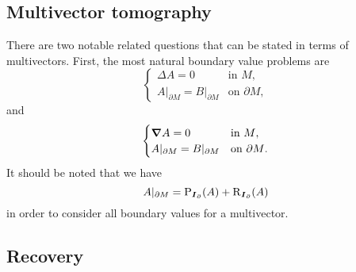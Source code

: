 \subsection{Multivector tomography}

There are two notable related questions that can be stated in terms of multivectors. First, the most natural boundary value problems are 
\begin{equation}
\label{eq:multivector_harmonic_bvp}
\begin{cases}
\Delta A = 0 & \textrm{in $M$},\\
A\vert_{\partial M} = B\vert_{\partial M} & \textrm{on $\partial M$},
\end{cases}
\end{equation}
and
\begin{equation}
\label{eq:multivector_monogenic_bvp}
\begin{cases}
\boldsymbol{\nabla} A = 0 & \textrm{in $M$},\\
A\vert_{\partial M} = B\vert_{\partial M} & \textrm{on $\partial M$}.
\end{cases}
\end{equation}
It should be noted that we have
\begin{equation}
A\vert_{\partial M} = \operatorname{P}_{\boldsymbol{I}_\partial}(A) + \operatorname{R}_{\boldsymbol{I}_\partial}(A)
\end{equation}
in order to consider all boundary values for a multivector. 

\subsection{Recovery}

